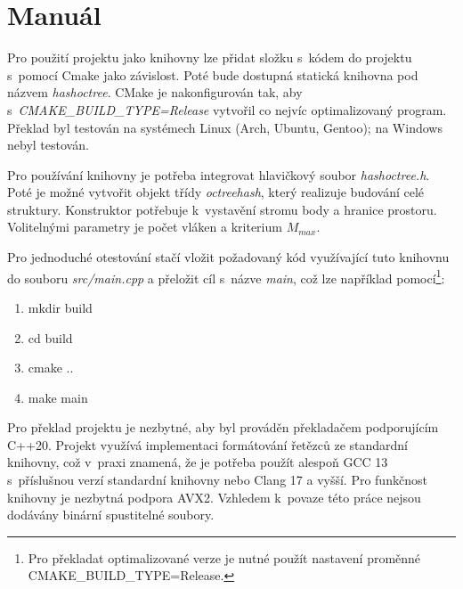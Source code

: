 \chapter{Manuál}
Pro použití projektu jako knihovny lze přidat složku s~kódem do projektu s~pomocí Cmake jako závislost. Poté bude dostupná statická knihovna pod názvem \emph{hashoctree}. CMake je nakonfigurován tak, aby s~\emph{CMAKE\_BUILD\_TYPE=Release} vytvořil co nejvíc optimalizovaný program. Překlad byl testován na systémech Linux (Arch, Ubuntu, Gentoo); na Windows nebyl testován.

Pro používání knihovny je potřeba integrovat hlavičkový soubor \emph{hashoctree.h}. Poté je možné vytvořit objekt třídy \emph{octreehash}, který realizuje budování celé struktury. Konstruktor potřebuje k~vystavění stromu body a hranice prostoru. Volitelnými parametry je počet vláken a kriterium $M_{max}$.

Pro jednoduché otestování stačí vložit požadovaný kód využívající tuto knihovnu do souboru \emph{src/main.cpp} a přeložit cíl s~názve \emph{main}, což lze například pomocí\footnote{Pro překladat optimalizované verze je nutné použít nastavení proměnné CMAKE\_BUILD\_TYPE=Release.}:
\begin{enumerate}
    \item mkdir build
    \item cd build
    \item cmake ..
    \item make main
\end{enumerate}

Pro překlad projektu je nezbytné, aby byl prováděn překladačem podporujícím C++20. Projekt využívá implementaci formátování řetězců ze standardní knihovny, což v~praxi znamená, že je potřeba použít alespoň GCC 13 s~příslušnou verzí standardní knihovny nebo Clang 17 a vyšší. Pro funkčnost knihovny je nezbytná podpora AVX2. Vzhledem k~povaze této práce nejsou dodávány binární spustitelné
soubory. 



